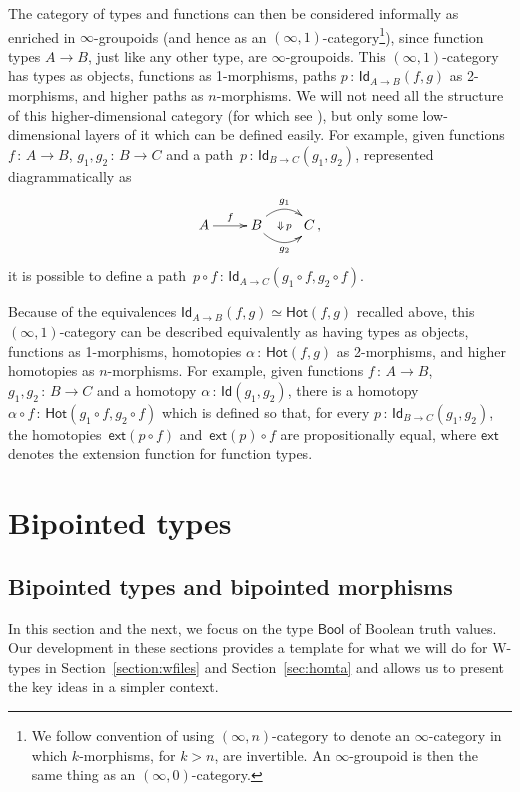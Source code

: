 \documentclass[10pt,a4paper,oneside,reqno]{amsart}
\numberwithin{equation}{section}
\theoremstyle{mythm}
\theoremstyle{mydef}
\theoremstyle{myrmk}
\newcommand{\co}{\,{:}\,}
\newcommand{\Hot}{\mathsf{Hot}}
\newcommand{\ext}{\mathsf{ext}}
\newcommand{\Bool}{\mathsf{Bool}}
\newcommand{\Id}{\mathsf{Id}}
\newcommand{\W}{\mathrm{W}}
\begin{document}
The category of types and functions can then be considered informally as enriched in $\infty$-groupoids
(and hence as an $(\infty, 1)$-category\footnote{We follow convention of using $(\infty, n)$-category to denote an $\infty$-category in which $k$-morphisms, for $k > n$, are invertible. An $\infty$-groupoid is then the same thing as an $(\infty,0)$-category.}), since function types  $A \to B$, just like any other type,
are $\infty$-groupoids. This $(\infty, 1)$-category has types as objects,
functions as 1-morphisms, paths $p \co \Id_{A \to B}(f, g)$ as 2-morphisms, and higher paths as $n$-morphisms. We will not need all the structure of this higher-dimensional category (for which see \cite{Lumsdaine:higcft}), but only some low-dimensional layers of it which can be defined easily.  For example, given functions $f \co A \to B$, $g_1, g_2 \co B \to C$ and a path~$p \co \Id_{B \to C}(g_1, g_2)$, represented diagrammatically as 
\[
\xymatrix{
A \ar[r]^{f} & B \ar@/^1pc/[r]^{g_1} \ar@/_1pc/[r]_{g_2} \ar@{}[r]|{\Downarrow \, p}  & C \, ,}
\]
it is possible to define a path~$p \circ f \co \Id_{A \to C} (g_1 \circ f,  g_2 \circ f)$. 

Because of the equivalences $\Id_{A \to B}(f,g) \simeq \Hot(f,g)$ recalled above, this $(\infty,1)$-category can be described equivalently
as having  types as objects, functions as 1-morphisms, homotopies $\alpha \co \Hot(f, g)$ as 2-morphisms, and higher homotopies as $n$-morphisms. For example, given functions $f \co A \to B$, $g_1, g_2 \co B \to C$ and a homotopy $\alpha \co \Id(g_1, g_2)$, there is a homotopy~$\alpha \circ f \co \Hot(g_1 \circ f, g_2 \circ f)$ which is defined so that, for every $p \co \Id_{B \to C}(g_1, g_2)$, the homotopies~$\ext( p \circ f )$ and~$\ext(p) \circ f$ are propositionally equal, where $\ext$ denotes the extension function for function types.



\section{Bipointed types}
\label{sec:bip}

\subsection*{Bipointed types and bipointed morphisms} \label{sec:biptm}
In this section and the next, we focus on the type $\Bool$ of Boolean truth values. Our development in
these sections provides a template for what we will do for $\W$-types in Section~\ref{section:wfiles}
and Section~\ref{sec:homta} and allows us to present the key ideas in a simpler context. 
\end{document}
